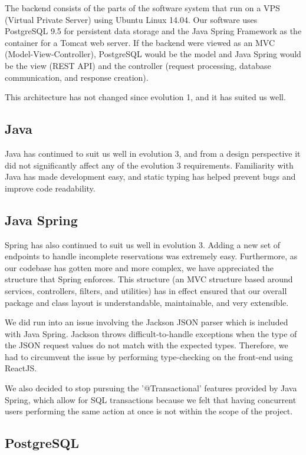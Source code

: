 \documentclass[12pt]{article}
\begin{document}
\label{sec:Backend}
The backend consists of the parts of the software system that run on a VPS (Virtual Private Server) using Ubuntu Linux 14.04. Our software uses PostgreSQL 9.5 for persistent data storage and the Java Spring Framework as the container for a Tomcat web server. If the backend were viewed as an MVC (Model-View-Controller), PostgreSQL would be the model and Java Spring would be the view (REST API) and the controller (request processing, database communication, and response creation). 

This architecture has not changed since evolution 1, and it has suited us well. 

\subsection{Java}
Java has continued to suit us well in evolution 3, and from a design perspective it did not significantly affect any of the evolution 3 requirements. Familiarity with Java has made development easy, and static typing has helped prevent bugs and improve code readability.

\subsection{Java Spring}
Spring has also continued to suit us well in evolution 3. Adding a new set of endpoints to handle incomplete reservations was extremely easy. Furthermore, as our codebase has gotten more and more complex, we have appreciated the structure that Spring enforces. This structure (an MVC structure based around services, controllers, filters, and utilities) has in effect ensured that our overall package and class layout is understandable, maintainable, and very extensible. 

We did run into an issue involving the Jackson JSON parser which is included with Java Spring. Jackson throws difficult-to-handle exceptions when the type of the JSON request values do not match with the expected types. Therefore, we had to circumvent the issue by performing type-checking on the front-end using ReactJS.

We also decided to stop pursuing the '@Transactional' features provided by Java Spring, which allow for SQL transactions because we felt that having concurrent users performing the same action at once is not within the scope of the project. 

\subsection{PostgreSQL}
\end{document}
